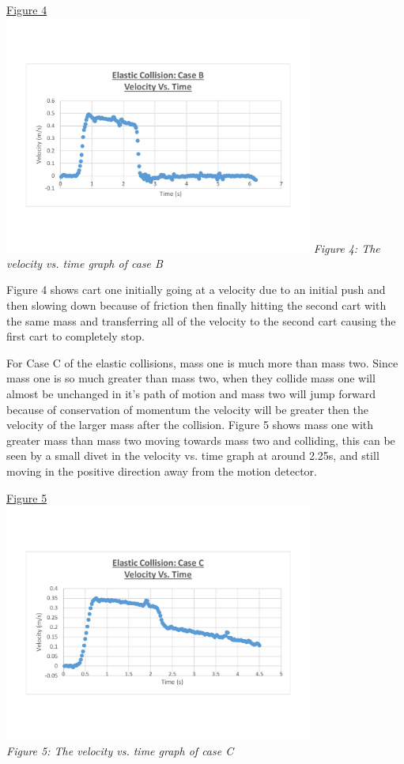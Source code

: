 \documentclass[aps,letterpaper,11pt]{revtex4}
\begin{document}
\begin{center}
\underline{Figure 4}\\
\includegraphics[width = 4in]{MassOneequalsMassTwo.pdf}
\textit{Figure 4: The velocity vs. time graph of case B}
\end{center}

Figure 4 shows cart one initially going at a velocity due to an initial push and then slowing down because of friction then finally hitting the second cart with the same mass and transferring all of the velocity to the second cart causing the first cart to completely stop.

For Case C of the elastic collisions, mass one is much more than mass two. Since mass one is so much greater than mass two, when they collide mass one will almost be unchanged in it's path of motion and mass two will jump forward because of conservation of momentum the velocity will be greater then the velocity of the larger mass after the collision. Figure 5 shows mass one with greater mass than mass two moving towards mass two and colliding, this can be seen by a small divet in the velocity vs. time graph at around 2.25s, and still moving in the positive direction away from the motion detector. 

\newpage

\begin{center}
\underline{Figure 5}\\
\includegraphics[width=4in]{MassOneWayBiggerMassTwo.pdf}\\
\textit{Figure 5: The velocity vs. time graph of case C}
\end{center}
\end{document}
